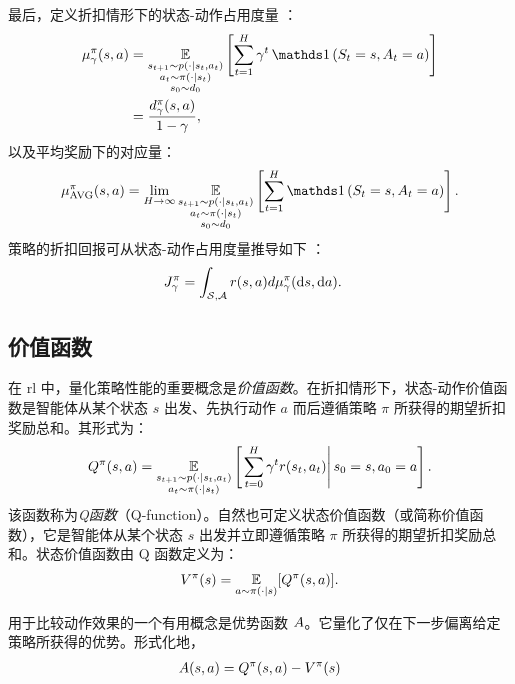 最后，定义折扣情形下的状态-动作占用度量 \cite{laroche2022non}：
\begin{align*}
    \discountedstateoccupancymeasure[\gamma] (s,a) &= \expectedvalue_{\substack{s_{t+1}\sim p(\cdot\vert s_t,a_t)\\a_t\sim\pi(\cdot\vert s_t)\\s_0\sim \initialstatedistribution}}\left[\sum_{t=1}^H \gamma^t \Ind\left(S_t=s, A_t=a\right)\right]
    \\
    &= \frac{\discountedstateoccupancydistribution[\gamma] (s,a)}{1-\gamma},
\end{align*}
以及平均奖励下的对应量：
\begin{align*}
    \averagestateoccupancymeasure[\pi] (s,a) = \lim_{H\rightarrow \infty}\expectedvalue_{\substack{s_{t+1}\sim p(\cdot\vert s_t,a_t)\\a_t\sim\pi(\cdot\vert s_t)\\s_0\sim \initialstatedistribution}}\left[\sum_{t=1}^H \Ind\left(S_t=s, A_t=a\right)\right].
\end{align*}
策略的折扣回报可从状态-动作占用度量推导如下 \cite[Lemma~1]{laroche2022non}：
\begin{align*}
    \expectedreturn[\gamma] &= \int_{\statespace,\actionspace} r(s,a)d\discountedstateoccupancymeasure[\gamma]  (\de s,\de a).
\end{align*}

\subsection{价值函数}
在 \gls{rl} 中，量化策略性能的重要概念是\emph{价值函数}。在折扣情形下，状态-动作价值函数是智能体从某个状态 $s$ 出发、先执行动作 $a$ 而后遵循策略 $\pi$ 所获得的期望折扣奖励总和。其形式为：
\begin{align}
    Q^\pi(s,a) = \operatorname*{\mathbb{E}}_{\substack{s_{t+1}\sim p(\cdot\vert s_t,a_t)\\a_t\sim\pi(\cdot\vert s_t)}}
    \left[\left.\sum_{t=0}^H \gamma^t r(s_t,a_t)\right\vert s_0=s, a_0=a\right].\label{eq:state_action_value_function}
\end{align}
该函数称为\emph{Q函数}（Q-function）。自然也可定义状态价值函数（或简称价值函数），它是智能体从某个状态 $s$ 出发并立即遵循策略 $\pi$ 所获得的期望折扣奖励总和。状态价值函数由 Q 函数定义为：
\begin{align*}
    V^\pi(s)=\operatorname*{\mathbb{E}}_{a\sim\pi(\cdot\vert s)}[Q^\pi(s,a)].
\end{align*}

用于比较动作效果的一个有用概念是优势函数 $A$。它量化了仅在下一步偏离给定策略所获得的优势。形式化地，
\begin{align}
\label{eq:advantage_function}
    A(s,a) = Q^\pi(s,a) - V^\pi(s)
\end{align}

